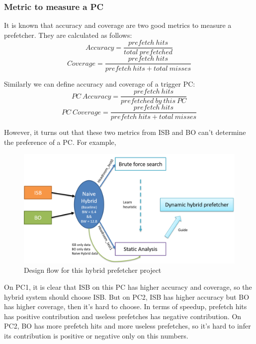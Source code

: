   \subsubsection{Metric to measure a PC}
  \label{sec:metricPC}
  
  It is known that accuracy and coverage are two good metrics to measure a prefetcher. They are calculated as follows:
  \begin{equation}
 Accuracy = \frac{prefetch\ hits}{total\  prefetched} 
 \end{equation}
  \begin{equation}
  Coverage = \frac{prefetch\ hits}{prefetch\ hits + total\ misses}
  \end{equation}
  
  Similarly we can define accuracy and coverage of a trigger PC:
  \begin{equation}
  PC\ Accuracy = \frac{prefetch\ hits}{prefetched\ by\ this\ PC}
  \end{equation}
  \begin{equation}
  PC\ Coverage = \frac{prefetch\ hits}{prefetch\ hits + total\ misses}
 \end{equation}
 
 However, it turns out that these two metrics from ISB and BO can't determine the preference of a PC. For example, 
 
 \begin{figure}[ht!]
	\centering
	\includegraphics[width=1.0\textwidth]{images/design_flow.png}
	\caption{Design flow for this hybrid prefetcher project}
	\label{fig:design_flow}
\end{figure}

On PC1, it is clear that ISB on this PC has higher accuracy and coverage, so the hybrid system should choose ISB. But on PC2, ISB has higher accuracy but BO has higher coverage, then it's hard to choose. In terms of speedup, prefetch hits has positive contribution and useless prefetches has negative contribution. On PC2, BO has more prefetch hits and more useless prefetches, so it's hard to infer its contribution is positive or negative only on this numbers. 
  
